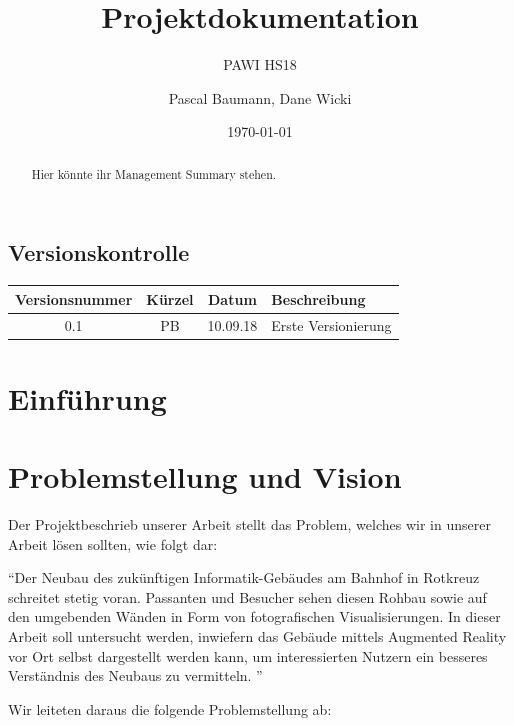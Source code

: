 \documentclass[a4paper]{scrreprt}
\title{Projektdokumentation}
\subtitle{PAWI HS18}
\author{Pascal Baumann, Dane Wicki}
\date{\today}
\begin{document}
\begin{titlepage}
\maketitle
\end{titlepage}

\renewcommand{\abstractname}{Management Summary}
\begin{abstract}
	Hier könnte ihr Management Summary stehen.
\end{abstract}

\section*{Versionskontrolle}

\begin{tabularx}{\textwidth}{|c|c|c|X|}
	\hline
	\textbf{Versionsnummer} & \textbf{Kürzel} & \textbf{Datum} & \textbf{Beschreibung} \\
	\hline
	0.1 & PB & 10.09.18 & Erste Versionierung \\
	\hline
\end{tabularx}

\tableofcontents

\chapter{Einführung}

\chapter{Problemstellung und Vision}

Der Projektbeschrieb unserer Arbeit stellt das Problem, welches wir in unserer Arbeit lösen sollten, wie folgt dar:

\vspace{1em}

\textquotedblleft Der Neubau des zukünftigen Informatik-Gebäudes am Bahnhof in Rotkreuz schreitet stetig voran. Passanten und Besucher sehen diesen Rohbau sowie auf den umgebenden Wänden in Form von fotografischen Visualisierungen.
In dieser Arbeit soll untersucht werden, inwiefern das Gebäude mittels Augmented Reality vor Ort selbst dargestellt werden kann, um interessierten Nutzern ein besseres Verständnis des Neubaus zu vermitteln. \textquotedblright

\vspace{1em}

Wir leiteten daraus die folgende Problemstellung ab:
\end{document}
